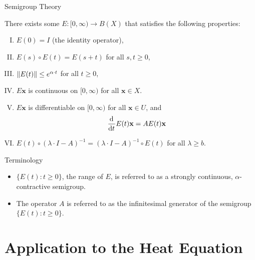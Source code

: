 \documentclass{beamer}
\begin{document}
\begin{frame}{Semigroup Theory}
    \begin{theorem}
           There exists some \(E : [0, \infty) \to B(X)\) that satisfies the following properties:
            \begin{enumerate}[I.]
                \item \(E(0) = I\) (the identity operator),
                \item \(E(s) \circ E(t) = E(s + t)\) for all \(s, t \geq 0\),
                \item \(\left\|E(t)\right\| \leq e^{\alpha \cdot t}\) for all \(t \geq 0\),
                \item \(E\mathbf{x}\) is continuous on \([0, \infty)\) for all \(\mathbf{x} \in X\).
                \item \(E\mathbf{x}\) is differentiable on \([0, \infty)\) for all \(\mathbf{x} \in U\), and
                \[
                \diff{t}E(t)\mathbf{x} = AE(t)\mathbf{x}
                \]
                \item \(E(t) \circ (\lambda \cdot I - A)^{-1} = (\lambda \cdot I - A)^{-1} \circ E(t)\) for all \(\lambda \geq b\).
            \end{enumerate}
        \end{theorem}
\end{frame}

\begin{frame}{Terminology}
        \begin{itemize}[<+-| alert@+>]
        \item \(\{E(t) : t \geq 0\}\), the range of \(E\), is referred to as a strongly continuous, \(\alpha\)-contractive semigroup. 
        \item The operator \(A\) is referred to as the infinitesimal generator of the semigroup \(\{E(t) : t \geq 0\}\).
    \end{itemize}
\end{frame}

\section{Application to the Heat Equation}
\end{document}
